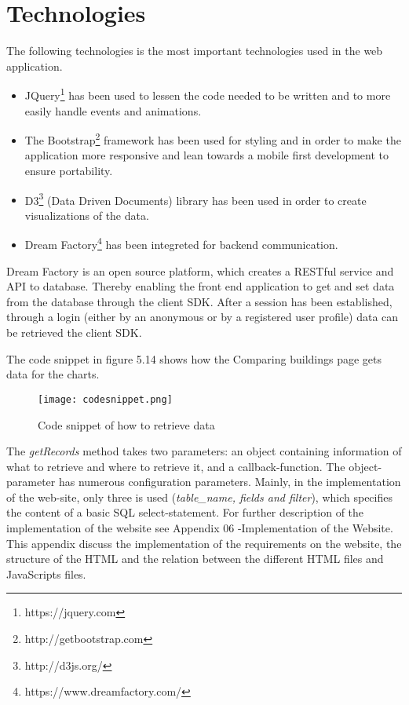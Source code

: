 \section*{Technologies}
The following technologies is the most important technologies used in the web application.
\begin{itemize}
\item JQuery\footnote{https://jquery.com} has been used to lessen the code needed to be written and to more easily handle events and animations.
\item The Bootstrap\footnote{http://getbootstrap.com} framework has been used for styling and in order to make the application more responsive and lean towards a mobile first development to ensure portability.
\item D3\footnote{http://d3js.org/} (Data Driven Documents) library has been used in order to create visualizations of the data.
\item Dream Factory\footnote{https://www.dreamfactory.com/} has been integreted for backend communication.
\end{itemize}
Dream Factory is an open source platform, which creates a RESTful service and API to database. Thereby enabling the front end application to get and set data from the database through the client SDK. 
After a session has been established, through a login (either by an anonymous or by a registered user profile) data can be retrieved the client SDK. 

The code snippet in figure 5.14 shows how the Comparing buildings page gets data for the charts.
\begin{figure}
\begin{center}
\texttt{[image: codesnippet.png]}
\end{center}
\caption{Code snippet of how to retrieve data}
\end{figure}
The \emph{getRecords} method takes two parameters: an object containing information of what to retrieve and where to retrieve it, and a callback-function.
The object-parameter has numerous configuration parameters. Mainly, in the implementation of the web-site, only three is used (\emph{table\_name, fields and filter}), which specifies the content of a basic SQL select-statement.
\newline
\newline
For further description of the implementation of the website see Appendix 06 -Implementation of the Website. This appendix discuss the implementation of the requirements on the website, the structure of the HTML and the relation between the different  HTML files and JavaScripts files.


